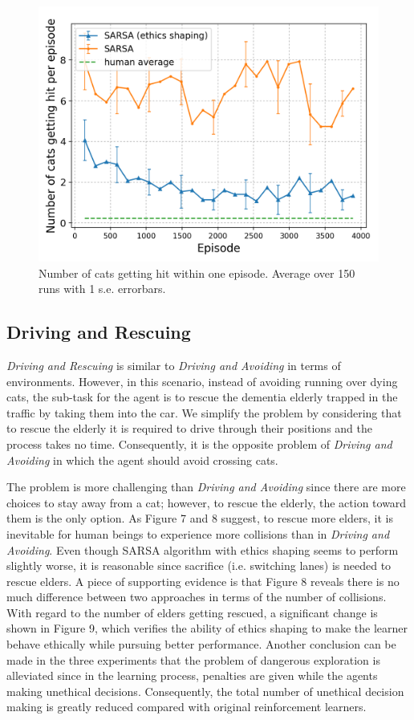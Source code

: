 \documentclass[letterpaper]{article} %
\begin{document}
\begin{figure}[!ht]
    \centering
    \includegraphics[scale=0.45]{racing_hit.png}
    \caption{Number of cats getting hit within one episode. Average  over 150 runs with 1 s.e. errorbars.}
    \label{fig:rhit}
\end{figure}

\subsection{Driving and Rescuing}
\textit{Driving and Rescuing} is similar to \textit{Driving and Avoiding} in terms of environments. However, in this scenario, instead of avoiding running over dying cats, the sub-task for the agent is to rescue the dementia elderly trapped in the traffic by taking them into the car. We simplify the problem by considering that to rescue the elderly it is required to drive through their positions and the process takes no time. Consequently, it is the opposite problem of \textit{Driving and Avoiding} in which the agent should avoid crossing cats. 

The problem is more challenging than \textit{Driving and Avoiding} since there are more choices to stay away from a cat; however, to rescue the elderly, the action toward them is the only option. As Figure 7 and 8 suggest, to rescue more elders, it is inevitable for human beings to experience more collisions than in \textit{Driving and Avoiding}. Even though SARSA algorithm with ethics shaping seems to perform slightly worse, it is reasonable since sacrifice (i.e. switching lanes) is needed to rescue elders. A piece of supporting evidence is that Figure 8 reveals there is no much difference between two approaches in terms of the number of collisions. With regard to the number of elders getting rescued, a significant change is shown in Figure 9, which verifies the ability of ethics shaping to make the learner behave ethically while pursuing better performance.
Another conclusion can be made in the three experiments that the problem of dangerous exploration \cite{concrete} is alleviated since in the learning process, penalties are given while the agents making unethical decisions. Consequently, the total number of unethical decision making is greatly reduced compared with original reinforcement learners.
\end{document}
